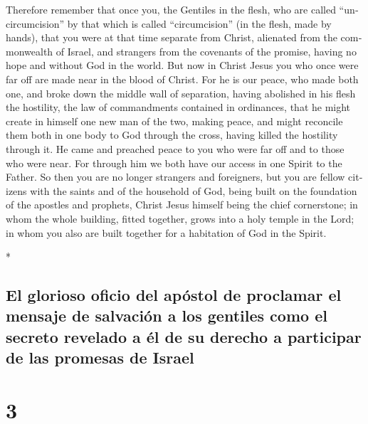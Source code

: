 \begin{paracol}{2}
\begin{otherlanguage}{english}
 Therefore remember that once you, the Gentiles in the
flesh, who are called ``uncircumcision'' by that which is called
``circumcision'' (in the flesh, made by hands),  that you
were at that time separate from Christ, alienated from the commonwealth
of Israel, and strangers from the covenants of the promise, having no
hope and without God in the world.  But now in Christ
Jesus you who once were far off are made near in the blood of Christ.
 For he is our peace, who made both one, and broke down
the middle wall of separation,  having abolished in his
flesh the hostility, the law of commandments contained in ordinances,
that he might create in himself one new man of the two, making peace,
 and might reconcile them both in one body to God through
the cross, having killed the hostility through it.  He
came and preached peace to you who were far off and to those who were
near.  For through him we both have our access in one
Spirit to the Father.  So then you are no longer
strangers and foreigners, but you are fellow citizens with the saints
and of the household of God,  being built on the
foundation of the apostles and prophets, Christ Jesus himself being the
chief cornerstone;  in whom the whole building, fitted
together, grows into a holy temple in the Lord;  in whom
you also are built together for a habitation of God in the Spirit.

\end{otherlanguage}

\switchcolumn[0]*

\hypertarget{el-glorioso-oficio-del-apuxf3stol-de-proclamar-el-mensaje-de-salvaciuxf3n-a-los-gentiles-como-el-secreto-revelado-a-uxe9l-de-su-derecho-a-participar-de-las-promesas-de-israel}{%
\subsection{El glorioso oficio del apóstol de proclamar el mensaje de
salvación a los gentiles como el secreto revelado a él de su derecho a
participar de las promesas de
Israel}\label{el-glorioso-oficio-del-apuxf3stol-de-proclamar-el-mensaje-de-salvaciuxf3n-a-los-gentiles-como-el-secreto-revelado-a-uxe9l-de-su-derecho-a-participar-de-las-promesas-de-israel}}

\hypertarget{section-4}{%
\section{3}\label{section-4}}


\end{paracol}
